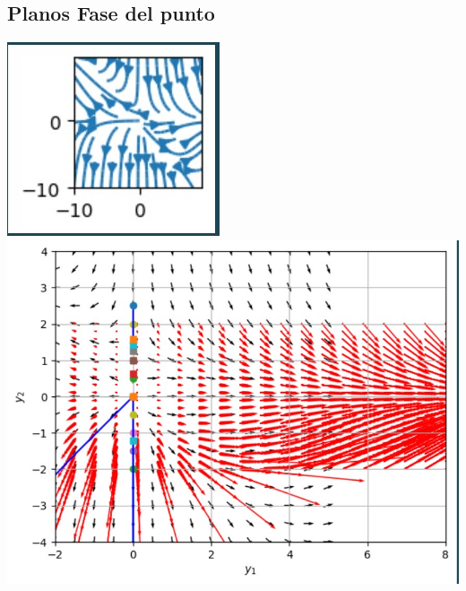 \documentclass{article}
\begin{document}
         \subsection*{Planos Fase del punto }
         \noindent
         \includegraphics{isoclinas d=-2 a=1.jpg}
          \includegraphics{vecotrial d=-2 a=1.jpg}
           
\end{document}

